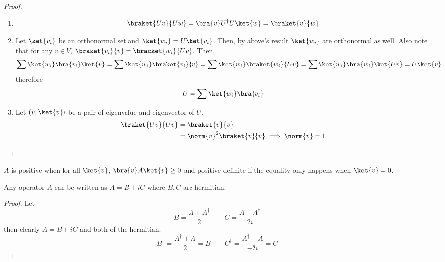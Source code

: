\begin{proof}
    \begin{enumerate}
        \item     
        \begin{equation*}
            \braket{Uv}{Uw} = \bra{v} U^{\dagger}U \ket{w} = \braket{v}{w}
        \end{equation*}
        \item Let \(\ket{v_i}\) be an orthonormal set and \(\ket{w_i} = U \ket{v_i}\). Then, by above's result \(\ket{w_i}\) are orthonormal as well.
        Also note that for any \(v \in V\), \(\braket{v_i}{v} = \bracket{w_i}{Uv}\). Then, 
        \begin{equation*}
            \sum \ket{w_i} \bra{v_i} \ket{v} = \sum \ket{w_i} \braket{v_i}{v} = \sum  \ket{w_i} \braket{w_i}{Uv} = \sum \ket{w_i} \bra{w_i} \ket{Uv} = U \ket{v}
        \end{equation*}
        therefore 
        \begin{equation*}
            U = \sum \ket{w_i} \bra{v_i}
        \end{equation*}
        \item Let \((v,\ket{v})\) be a pair of eigenvalue and eigenvector of \(U\).
        \begin{align*}
            \braket{Uv}{Uv} &= \braket{v}{v}\\
            &= \norm{v}^2 \braket{v}{v} \implies \norm{v} = 1
        \end{align*}
    \end{enumerate}
\end{proof}
\(A\) is positive when for all \(\ket{v}\), \(\bra{v} A \ket{v} \geq 0\) and positive definite if the equality only happens when \(\ket{v} = 0\).
\begin{proposition}
    Any operator \(A\) can be written as \(A = B + iC\) where \(B,C\) are hermitian.
\end{proposition}
\begin{proof}
    Let 
    \begin{equation*}
        B = \dfrac{A + A^{\dagger}}{2} \qquad C = \dfrac{A - A^{\dagger}}{2i}
    \end{equation*}
    then clearly \(A = B + iC\) and both of the hermitian. 
    \begin{equation*}
        B^{\dagger} = \dfrac{A^{\dagger} + A}{2} = B\qquad C^{\dagger} = \dfrac{A^{\dagger} - A}{-2i} = C
    \end{equation*}
\end{proof}
